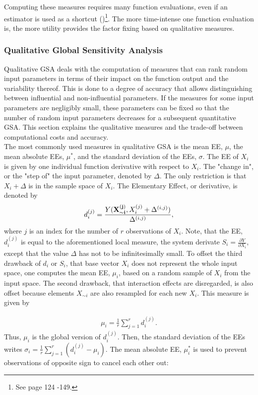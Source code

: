 \documentclass[a4paper,12pt]{article}
\begin{document}
\noindent
Computing these measures requires many function evaluations, even if an estimator is used as a shortcut (\cite{Saltelli.2004})\footnote{See page 124 -149.}. The more time-intense one function evaluation is, the more utility provides the factor fixing based on qualitative measures. 


\subsubsection{Qualitative Global Sensitivity Analysis}


Qualitative GSA deals with the computation of measures that can rank random input parameters in terms of their impact on the function output and the variability thereof. This is done to a degree of accuracy that allows distinguishing between influential and non-influential parameters. If the measures for some input parameters are negligibly small, these parameters can be fixed so that the number of random input parameters decreases for a subsequent quantitative GSA. This section explains the qualitative measures and the trade-off between computational costs and accuracy. \\

\noindent
The most commonly used measures in qualitative GSA is the mean EE, $\mu$, the mean absolute EEs, $\mu^*$, and the standard deviation of the EEs, $\sigma$. The EE of $X_i$ is given by one individual function derivative with respect to $X_i$. The "change in", or the "step of" the input parameter, denoted by $\Delta$. The only restriction is that $X_i + \Delta$ is in the sample space of $X_i$. The Elementary Effect, or derivative, is denoted by
\begin{align}
d_i^{(j)} =  \frac{Y(\bold{X_{\sim i}^{(j)}}, X_i^{(j)} + \Delta^{(i,j)})}{\Delta^{(i,j)}},
\end{align}
where $j$ is an index for the number of $r$ observations of $X_i$.
Note, that the EE, $d_i^{(j)}$ is equal to the aforementioned local measure, the system derivate $S_i = \frac{\partial Y}{\partial X_i}$, except that the value $\Delta$ has not to be infinitesimally small. To offset the third drawback of $d_i$ or $S_i$, that base vector $X_i$ does not represent the whole input space, one computes the mean EE, $\mu_i$, based on a random sample of $X_i$ from the input space. The second drawback, that interaction effects are disregarded, is also offset because elements $X_{\sim i}$ are also resampled for each new $X_i$. This measure is given by

\begin{align}
\mu_i = \frac{1}{r} \sum_{j=1}^{r} d_i^{(j)}.
\end{align}
\noindent
Thus, $\mu_i$ is the global version of $d_i^{(j)}$. Then, the standard deviation of the EEs writes $\sigma_i = \frac{1}{r} \sum_{j=1}^{r} (d_i^{(j)} - \mu_i)$. The mean absolute EE, $\mu_i^*$ is used to prevent observations of opposite sign to cancel each other out:
\end{document}
